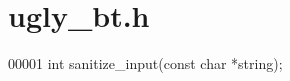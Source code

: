 \hypertarget{ugly__bt_8h_source}{}\section{ugly\+\_\+bt.\+h}
\label{ugly__bt_8h_source}

\begin{DoxyCode}
00001 \textcolor{keywordtype}{int} sanitize\_input(\textcolor{keyword}{const} \textcolor{keywordtype}{char} *\textcolor{keywordtype}{string});
\end{DoxyCode}
